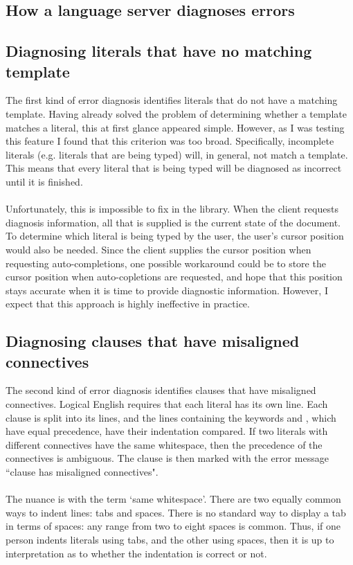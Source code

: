 \documentclass[../main.tex]{subfiles}
\begin{document}
\subsection{How a language server diagnoses errors}

\subsection{Diagnosing literals that have no matching template}
The first kind of error diagnosis identifies literals that do not have a matching template. Having already solved the problem of determining whether a template matches a literal, this at first glance appeared simple.
However, as I was testing this feature I found that this criterion was too broad. Specifically, incomplete literals (e.g. literals that are being typed) will, in general, not match a template. This means that every literal that is being typed will be diagnosed as incorrect until it is finished. 
\\
\\
Unfortunately, this is impossible to fix in the  library. When the client requests diagnosis information, all that is supplied is the current state of the document. To determine which literal is being typed by the user, the user's cursor position would also be needed. Since the client supplies the cursor position when requesting auto-completions, one possible workaround could be to store the cursor position when auto-copletions are requested, and hope that this position stays accurate when it is time to provide diagnostic information. However, I expect that this approach is highly ineffective in practice.

\subsection{Diagnosing clauses that have misaligned connectives}
The second kind of error diagnosis identifies clauses that have misaligned connectives. Logical English requires that each literal has its own line. Each clause is split into its lines, and the lines containing the keywords  and , which have equal precedence, have their indentation compared. If two literals with different connectives have the same whitespace, then the precedence of the connectives is ambiguous. The clause is then marked with the error message ``clause has misaligned connectives".
\\
\\
The nuance is with the term `same whitespace'. There are two equally common ways to indent lines: tabs and spaces. There is no standard way to display a tab in terms of spaces: any range from two to eight spaces is common. Thus, if one person indents literals using tabs, and the other using spaces, then it is up to interpretation as to whether the indentation is correct or not.
\end{document}
